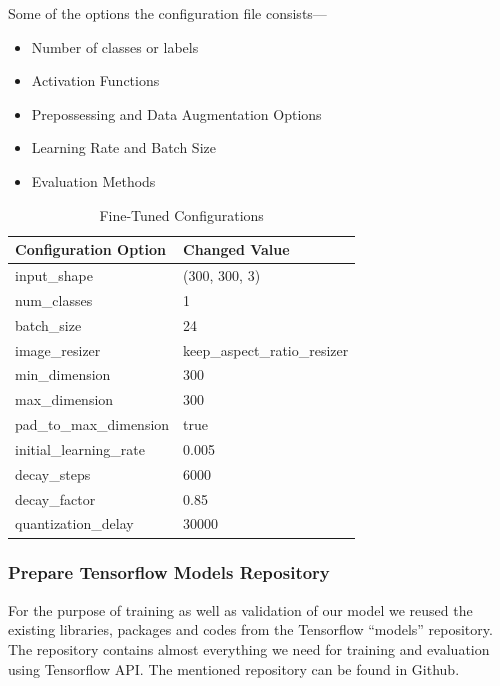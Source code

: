 \documentclass[conference]{IEEEtran}
\begin{document}
Some of the options the configuration file consists---
\begin{itemize}
  \item Number of classes or labels
  \item Activation Functions
  \item Prepossessing and Data Augmentation Options
  \item Learning Rate and Batch Size
  \item Evaluation Methods
\end{itemize}
            
\begin{table}[h]
  \centering
  \caption{Fine-Tuned Configurations}
  \label{tab:fine_tuned_conf}    \renewcommand{\arraystretch}{1.3}
  \begin{tabular}{l||l}
    \bfseries{Configuration Option} & \bfseries{Changed Value}     \\\hline\hline
    input\_shape                    & (300, 300, 3)                \\\hline
    num\_classes                    & 1                            \\\hline
    batch\_size                     & 24                           \\\hline
    image\_resizer                  & keep\_aspect\_ratio\_resizer \\\hline
    min\_dimension                  & 300                          \\\hline
    max\_dimension                  & 300                          \\\hline
    pad\_to\_max\_dimension         & true                         \\\hline
    initial\_learning\_rate         & 0.005                        \\\hline
    decay\_steps                    & 6000                         \\\hline
    decay\_factor                   & 0.85                         \\\hline
    quantization\_delay             & 30000                        \\\hline
  \end{tabular}
\end{table}
      
\subsubsection{Prepare Tensorflow Models Repository}
For the purpose of training as well as validation of our model we reused the existing libraries, packages and codes from the Tensorflow ``models'' repository\cite{tf_models_repo}. The repository contains almost everything we need for training and evaluation using Tensorflow API. The mentioned repository can be found in Github\cite{tf_models_repo}.
    
\end{document}
